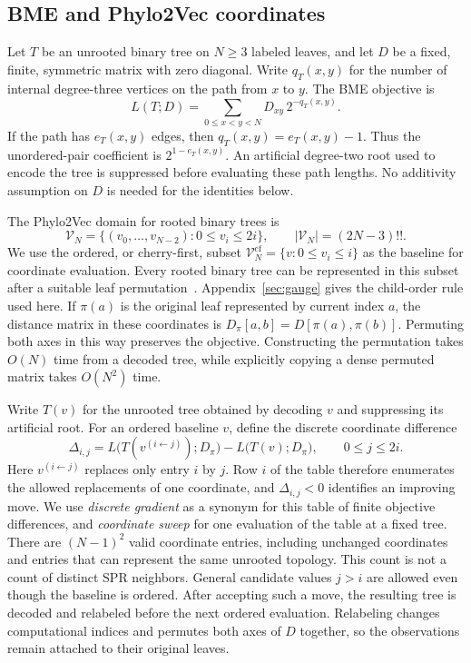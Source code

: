 \documentclass[11pt,a4paper]{article}
\makeatletter
\DeclareRobustCommand{\_}{\ifmmode\nfss@text{\textunderscore}\else\textunderscore\allowbreak\fi}
\theoremstyle{definition}
\makeatother
\begin{document}
\subsection{BME and Phylo2Vec coordinates}
\label{sec:coordinates}

Let $T$ be an unrooted binary tree on $N\geq3$ labeled leaves, and let $D$ be a fixed, finite, symmetric matrix with zero diagonal.
Write $q_T(x,y)$ for the number of internal degree-three vertices on the path from $x$ to $y$.
The BME objective is
\begin{equation}
 L(T;D)=\sum_{0\leq x<y<N}D_{xy}\,2^{-q_T(x,y)}.
 \label{eq:pauplin}
\end{equation}
If the path has $e_T(x,y)$ edges, then $q_T(x,y)=e_T(x,y)-1$.
Thus the unordered-pair coefficient is $2^{1-e_T(x,y)}$.
An artificial degree-two root used to encode the tree is suppressed before evaluating these path lengths.
No additivity assumption on $D$ is needed for the identities below.

The Phylo2Vec domain for rooted binary trees is
\begin{equation}
 \mathcal V_N=\{(v_0,\ldots,v_{N-2}):0\leq v_i\leq2i\},
 \qquad |\mathcal V_N|=(2N-3)!!.
 \label{eq:phylo2vec_space}
\end{equation}
We use the ordered, or cherry-first, subset
$\mathcal V_N^{\mathrm{cf}}=\{v:0\leq v_i\leq i\}$ as the baseline for coordinate evaluation.
Every rooted binary tree can be represented in this subset after a suitable leaf permutation~\cite[Lemmas~0.9--0.11]{penn2023gradme}.
Appendix~\ref{sec:gauge} gives the child-order rule used here.
If $\pi(a)$ is the original leaf represented by current index $a$, the distance matrix in these coordinates is
$D_\pi[a,b]=D[\pi(a),\pi(b)]$.
Permuting both axes in this way preserves the objective.
Constructing the permutation takes $O(N)$ time from a decoded tree, while explicitly copying a dense permuted matrix takes $O(N^2)$ time.

Write $T(v)$ for the unrooted tree obtained by decoding $v$ and suppressing its artificial root.
For an ordered baseline $v$, define the discrete coordinate difference
\begin{equation}
 \Delta_{i,j}
 =L\bigl(T(v^{(i\leftarrow j)});D_\pi\bigr)
  -L\bigl(T(v);D_\pi\bigr),\qquad 0\leq j\leq2i.
 \label{eq:discrete_gradient}
\end{equation}
Here $v^{(i\leftarrow j)}$ replaces only entry $i$ by $j$.
Row $i$ of the table therefore enumerates the allowed replacements of one coordinate, and $\Delta_{i,j}<0$ identifies an improving move.
We use \emph{discrete gradient} as a synonym for this table of finite objective differences, and \emph{coordinate sweep} for one evaluation of the table at a fixed tree.
There are $(N-1)^2$ valid coordinate entries, including unchanged coordinates and entries that can represent the same unrooted topology.
This count is not a count of distinct SPR neighbors.
General candidate values $j>i$ are allowed even though the baseline is ordered.
After accepting such a move, the resulting tree is decoded and relabeled before the next ordered evaluation.
Relabeling changes computational indices and permutes both axes of $D$ together, so the observations remain attached to their original leaves.
\end{document}
